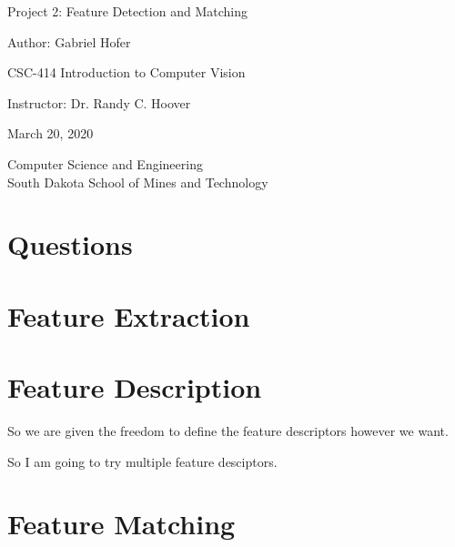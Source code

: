 \documentclass[12pt]{article}
\begin{document}
\begin{titlepage}
   \begin{center}
       \vspace*{1cm}
       \Large
       Project 2: Feature Detection and Matching
       \normalsize

       \vspace{0.5cm}

       Author: Gabriel Hofer

       \vspace{0.5cm}

       CSC-414 Introduction to Computer Vision

       \vspace{0.5cm}

       Instructor: Dr. Randy C. Hoover

       \vspace{0.5cm}

       March 20, 2020

       \vfill

       Computer Science and Engineering\\
       South Dakota School of Mines and Technology\\
   \end{center}
\end{titlepage}
\newpage
\section{Questions}

\section{Feature Extraction}
\section{Feature Description}

So we are given the freedom to define the feature descriptors however we want. 

So I am going to try multiple feature desciptors.


\section{Feature Matching}
\end{document}
